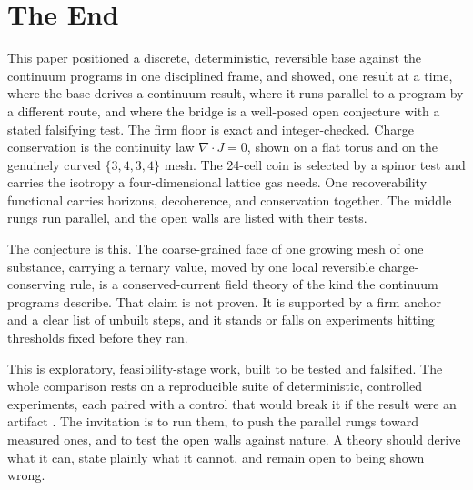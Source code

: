 \section{The End}

This paper positioned a discrete, deterministic, reversible base against the continuum programs in one
disciplined frame, and showed, one result at a time, where the base derives a continuum result, where it runs parallel to a
program by a different route, and where the bridge is a well-posed open conjecture with a stated falsifying test. The firm
floor is exact and integer-checked. Charge conservation is the continuity law $\nabla\!\cdot J = 0$, shown on a flat torus
and on the genuinely curved $\{3,4,3,4\}$ mesh. The 24-cell coin is selected by a spinor test and carries the isotropy a
four-dimensional lattice gas needs. One recoverability functional carries horizons, decoherence, and conservation
together. The middle rungs run parallel, and the open walls are listed with their tests.

The conjecture is this. The coarse-grained face of one growing mesh of one substance, carrying a ternary value, moved by
one local reversible charge-conserving rule, is a conserved-current field theory of the kind the continuum programs
describe. That claim is not proven. It is supported by a firm anchor and a clear list of unbuilt steps, and it stands or
falls on experiments hitting thresholds fixed before they ran.

This is exploratory, feasibility-stage work, built to be tested and falsified. The whole comparison rests on a reproducible suite of deterministic, controlled experiments, each paired
with a control that would break it if the result were an artifact \cite{cluesurf2026repo}. The invitation is to run them,
to push the parallel rungs toward measured ones, and to test the open walls against nature. A theory should derive what it
can, state plainly what it cannot, and remain open to being shown wrong.
